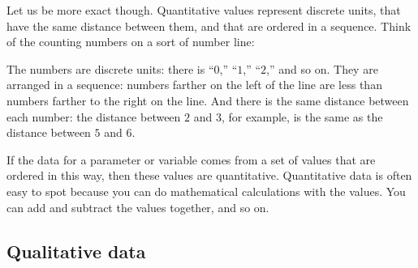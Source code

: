 \documentclass[../../../main.tex]{subfiles}
\begin{document}
Let us be more exact though. Quantitative values represent discrete units, that have the same distance between them, and that are ordered in a sequence. Think of the counting numbers on a sort of number line:

  \begin{center}
  \end{center}

The numbers are discrete units: there is ``$0$,'' ``$1$,'' ``$2$,'' and so on. They are arranged in a sequence: numbers farther on the left of the line are less than numbers farther to the right on the line. And there is the same distance between each number: the distance between $2$ and $3$, for example, is the same as the distance between $5$ and $6$.

If the data for a parameter or variable comes from a set of values that are ordered in this way, then these values are quantitative. Quantitative data is often easy to spot because you can do mathematical calculations with the values. You can add and subtract the values together, and so on.


\subsection{Qualitative data}
\end{document}
